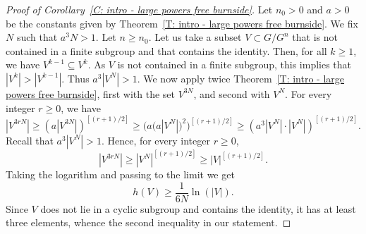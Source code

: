 \begin{proof}[Proof of Corollary~\ref{C: intro - large powers free burnside}]
Let $n_0>0$ and $a>0$ be the constants given by Theorem~\ref{T: intro - large powers free burnside}.
We fix $N$ such that $a^3N>1$.
Let $n\geqslant n_0$.
Let us take a subset $V\subset G/G^n$ that is not contained in a finite subgroup and that contains the identity. Then, for all $k\geqslant 1$, we have $V^{k-1} \subseteq V^k$. As $V$ is not contained in a finite subgroup, this implies that $|V^k|>|V^{k-1}|$. Thus $a^3|V^ N|>1$.
We now apply twice Theorem~\ref{T: intro - large powers free burnside},
first with the set $V^{3N}$, and second with $V^N$.
For every integer $r \geq 0$, we have
\begin{equation*}
|V^{3rN}|
\geq \left(a |V^{3N}| \right)^{[(r+1)/2]}
\geq \bigl(a \bigl(a|V^N|\bigr)^2 \bigr)^{[(r+1)/2]}
\geq \left(a^3|V^N| \cdot |V^N| \right)^{[(r+1)/2]}.
\end{equation*}
Recall that $a^3|V^ N|>1$.
Hence, for every integer $r \geq 0$,
\begin{equation*}
|V^{3rN}|
\geq |V^N| ^{[(r+1)/2]}
\geq |V|^{[(r+1)/2]}.
\end{equation*}
Taking the logarithm and passing to the limit we get
\begin{equation*}
h(V)
\geq \frac 1{6N} \ln(|V|).
\end{equation*}
Since $V$ does not lie in a cyclic subgroup and contains the identity, it has at least three elements, whence the second inequality in our statement.
\end{proof}

